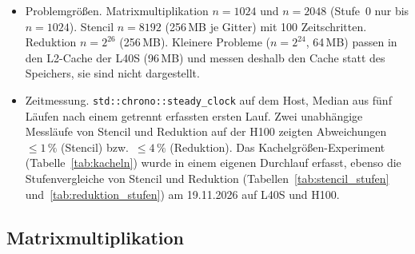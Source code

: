 \documentclass[12pt,a4paper]{article}
\begin{document}
\begin{itemize}[nosep]
    Rechengenauigkeit verglichen wird wie in den eigenen Kerneln.
    \item Problemgrößen. Matrixmultiplikation $n = 1024$ und $n = 2048$
    (Stufe~0 nur bis $n = 1024$). Stencil $n = 8192$ (256\,MB je Gitter) mit
    100 Zeitschritten. Reduktion $n = 2^{26}$ (256\,MB). Kleinere Probleme
    ($n = 2^{24}$, 64\,MB) passen in den L2-Cache der L40S (96\,MB) und messen
    deshalb den Cache statt des Speichers, sie sind nicht dargestellt.
    \item Zeitmessung. \texttt{std::chrono::steady\_clock} auf dem Host,
    Median aus fünf Läufen nach einem getrennt erfassten ersten Lauf. Zwei
    unabhängige Messläufe von Stencil und Reduktion auf der H100 zeigten
    Abweichungen $\le 1\,\%$ (Stencil) bzw.\ $\le 4\,\%$ (Reduktion). Das
    Kachelgrößen-Experiment (Tabelle~\ref{tab:kacheln}) wurde in einem eigenen
    Durchlauf erfasst, ebenso die Stufenvergleiche von Stencil und Reduktion
    (Tabellen~\ref{tab:stencil_stufen} und~\ref{tab:reduktion_stufen}) am
    19.11.2026 auf L40S und H100.
\end{itemize}

\subsection{Matrixmultiplikation}\label{sec:a-matmul}
\end{document}
